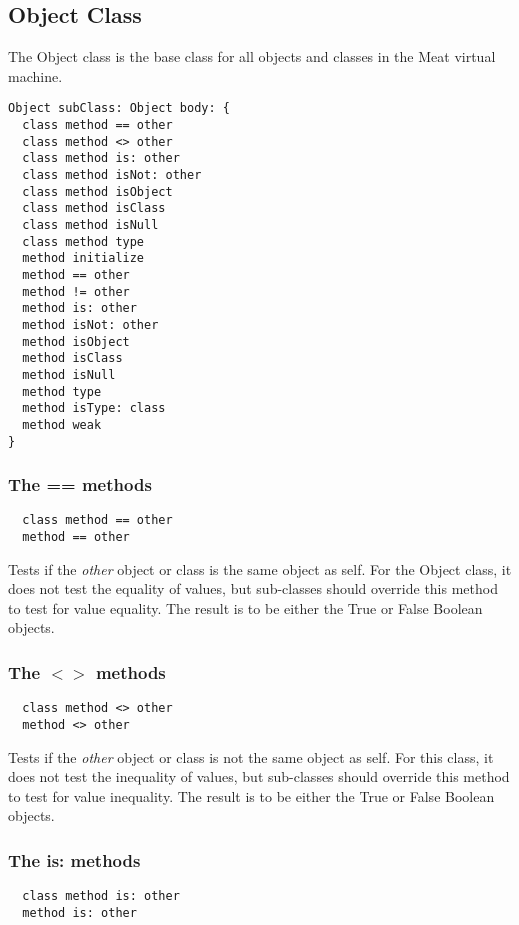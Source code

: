 \subsection {Object Class}

The Object class is the base class for all objects and classes in the Meat virtual machine.

\begin{lstlisting}
Object subClass: Object body: {
  class method == other
  class method <> other
  class method is: other
  class method isNot: other
  class method isObject
  class method isClass
  class method isNull
  class method type
  method initialize
  method == other
  method != other
  method is: other
  method isNot: other
  method isObject
  method isClass
  method isNull
  method type
  method isType: class
  method weak
}
\end{lstlisting}

\subsubsection {The == methods}
\begin{lstlisting}
  class method == other
  method == other
\end{lstlisting}

Tests if the \textit{other} object or class is the same object as self. For the Object class, it does not test the equality of values, but sub-classes should override this method to test for value equality. The result is to be either the True or False Boolean objects.

\hfill
\subsubsection {The $<>$ methods}
\begin{lstlisting}
  class method <> other
  method <> other
\end{lstlisting}

Tests if the \textit{other} object or class is not the same object as self. For this class, it does not test the inequality of values, but sub-classes should override this method to test for value inequality. The result is to be either the True or False Boolean objects.

\hfill
\subsubsection {The is: methods}
\begin{lstlisting}
  class method is: other
  method is: other
\end{lstlisting}

